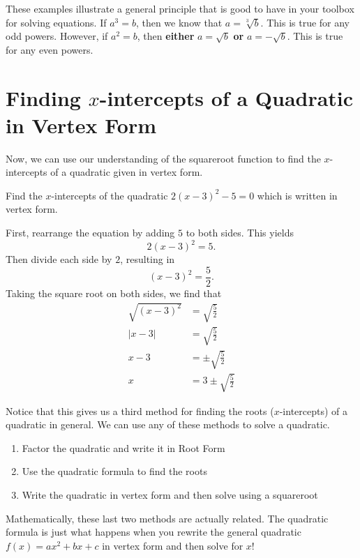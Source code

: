 \documentclass{ximera}
\begin{document}
These examples illustrate a general principle that is good to have in your toolbox for solving equations. If $a^3=b$, then we know that $a = \sqrt[3]{b}$. This is true for any odd powers. However, if $a^2 =b$, then {\bf either} $a=\sqrt{b}$ {\bf or} $a = -\sqrt{b}$. This is true for any even powers.  

\section{Finding $x$-intercepts of a Quadratic in Vertex Form}

Now, we can use our understanding of the squareroot function to find the $x$-intercepts of a quadratic given in vertex form.

\begin{example}
Find the $x$-intercepts of the quadratic $2(x-3)^2-5= 0$ which is written in vertex form. 

\begin{explanation}
First, rearrange the equation by adding $5$ to both sides. This yields $$2(x-3)^2 = 5.$$ Then divide each side by $2$, resulting in $$(x-3)^2 = \frac{5}{2}.$$ Taking the square root on both sides, we find that 
\begin{align*}
\sqrt{(x-3)^2} &= \sqrt{\frac{5}{2}} \\
|x-3| &= \sqrt{\frac{5}{2}}\\
x-3 &= \pm \sqrt{\frac{5}{2}}\\
x &= 3 \pm \sqrt{\frac{5}{2}}
\end{align*}
\end{explanation}
\end{example}

Notice that this gives us a third method for finding the roots ($x$-intercepts) of a quadratic in general. We can use any of these methods to solve a quadratic.
\begin{enumerate}
\item Factor the quadratic and write it in Root Form
\item Use the quadratic formula to find the roots
\item Write the quadratic in vertex form and then solve using a squareroot
\end{enumerate}

Mathematically, these last two methods are actually related.  The quadratic formula is just what happens when you rewrite the general quadratic $f(x)=ax^2+bx+c$ in vertex form and then solve for $x$!
\end{document}
